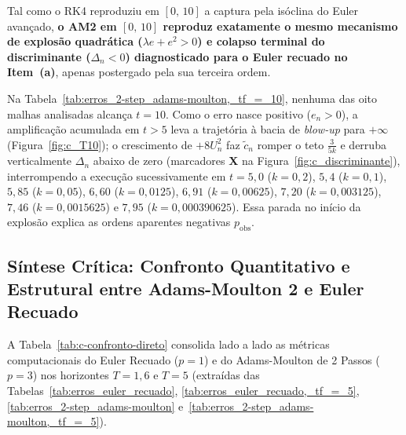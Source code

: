 \documentclass[12pt, a4paper]{article}
\begin{document}
Tal como o RK4 reproduziu em $[0,\, 10]$ a captura pela isóclina do Euler avançado, \textbf{o AM2 em $[0,\, 10]$ reproduz exatamente o mesmo mecanismo de explosão quadrática ($\lambda e + e^2 > 0$) e colapso terminal do discriminante ($\Delta_n < 0$) diagnosticado para o Euler recuado no Item~(a)}, apenas postergado pela sua terceira ordem.

Na Tabela~\ref{tab:erros_2-step_adams-moulton,_tf_=_10}, nenhuma das oito malhas analisadas alcança $t = 10$. Como o erro nasce positivo ($e_n > 0$), a amplificação acumulada em $t > 5$ leva a trajetória à bacia de \emph{blow-up} para $+\infty$ (Figura~\ref{fig:c_T10}); o crescimento de $+8U_n^2$ faz $\tilde{c}_n$ romper o teto $\frac{3}{5k}$ e derruba verticalmente $\Delta_n$ abaixo de zero (marcadores \textbf{X} na Figura~\ref{fig:c_discriminante}), interrompendo a execução sucessivamente em $t = 5{,}0$ ($k = 0{,}2$), $5{,}4$ ($k = 0{,}1$), $5{,}85$ ($k = 0{,}05$), $6{,}60$ ($k = 0{,}0125$), $6{,}91$ ($k = 0{,}00625$), $7{,}20$ ($k = 0{,}003125$), $7{,}46$ ($k = 0{,}0015625$) e $7{,}95$ ($k = 0{,}000390625$). Essa parada no início da explosão explica as ordens aparentes negativas $p_{\text{obs}}$.


\subsection{Síntese Crítica: Confronto Quantitativo e Estrutural entre Adams-Moulton 2 e Euler Recuado}
\label{sec:c-sintese}

A Tabela~\ref{tab:c-confronto-direto} consolida lado a lado as métricas computacionais do Euler Recuado ($p=1$) e do Adams-Moulton de 2 Passos ($p=3$) nos horizontes $T = 1{,}6$ e $T = 5$ (extraídas das Tabelas~\ref{tab:erros_euler_recuado}, \ref{tab:erros_euler_recuado,_tf_=_5}, \ref{tab:erros_2-step_adams-moulton} e~\ref{tab:erros_2-step_adams-moulton,_tf_=_5}).
\end{document}
